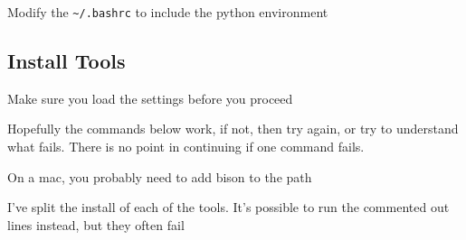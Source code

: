 Modify the \texttt{\textasciitilde{}/.bashrc} to include the python
environment

\begin{Shaded}
\begin{Highlighting}[]
 \OperatorTok{=}
\end{Highlighting}
\end{Shaded}

\subsection{Install Tools}\label{install-tools}

Make sure you load the settings before you proceed

\begin{Shaded}
\begin{Highlighting}[]
\end{Highlighting}
\end{Shaded}

Hopefully the commands below work, if not, then try again, or try to
understand what fails. There is no point in continuing if one command
fails.

\begin{Shaded}
\begin{Highlighting}[]
\end{Highlighting}
\end{Shaded}

On a mac, you probably need to add bison to the path

\begin{Shaded}
\begin{Highlighting}[]
 \OperatorTok{=}
\end{Highlighting}
\end{Shaded}

I've split the install of each of the tools. It's possible to run the
commented out lines instead, but they often fail

\begin{Shaded}
\begin{Highlighting}[]
\end{Highlighting}
\end{Shaded}

